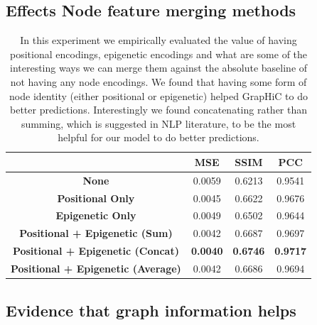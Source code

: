 \subsection{Effects Node feature merging methods}
\begin{table}[H]
\centering
\begin{tabular}{cccc}
\hline
                                           & \textbf{MSE}    & \textbf{SSIM}   & \textbf{PCC}    \\ \hline
\textbf{None}                              & 0.0059          & 0.6213          & 0.9541          \\
\textbf{Positional Only}                   & 0.0045          & 0.6622          & 0.9676          \\
\textbf{Epigenetic Only}                   & 0.0049          & 0.6502          & 0.9644          \\
\textbf{Positional + Epigenetic (Sum)}     & 0.0042          & 0.6687          & 0.9697          \\ 
\textbf{Positional + Epigenetic (Concat)}  & \textbf{0.0040} & \textbf{0.6746} & \textbf{0.9717} \\
\textbf{Positional + Epigenetic (Average)} & 0.0042          & 0.6686          & 0.9694         \\\hline 
\end{tabular}
\caption{
    \label{supp-tab:encoding-merging-methods} In this experiment we empirically evaluated the value of  having positional encodings, epigenetic encodings and what are some of the interesting ways we can merge them against the absolute baseline of not having any node encodings. We found that having some form of node identity (either positional or epigenetic) helped GrapHiC to do better predictions. Interestingly we found concatenating rather than summing, which is suggested in NLP literature, to be the most helpful for our model to do better predictions. 
}
\end{table}

\subsection{Evidence that graph information helps}


